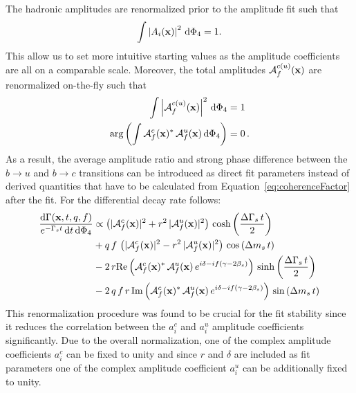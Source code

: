 The hadronic amplitudes are renormalized prior to the amplitude fit such that 
\begin{equation}
	\int  \left\vert   A_{i}(\mathbf{x}) \right\vert^{2} \, \mathrm{d}\Phi_4= 1 .
\end{equation}
This allow us to set more intuitive starting values as the amplitude coefficients are all on a comparable scale.
Moreover, the total amplitudes $\mathcal A^{c(u)}_{f}(\mathbf{x})$ are renormalized on-the-fly such that
\begin{align}
	\nonumber 
	\int  \left\vert  \mathcal A^{c(u)}_{f}(\mathbf{x}) \right\vert^{2} \, \mathrm{d}\Phi_4  & = 1  \\
	\text{arg}\left( \int \mathcal A^{c}_{f}(\mathbf{x})^* \, \mathcal A^{u}_{f}(\mathbf{x}) \, \mathrm{d}\Phi_4 \right) & = 0    \,.
\end{align}
As a result, the average amplitude ratio and strong phase difference between the $b\to u$ and $b\to c$ transitions can be introduced as direct fit parameters 
instead of derived quantities that have to be calculated from Equation~\ref{eq:coherenceFactor}
after the fit.
For the differential decay rate follows:
\begin{equation}
\begin{split}
\label{eq:PDF_full2}
	\frac{\text{d}\Gamma(\mathbf{x},t,q,f)}{ e^{- \Gamma_s t} \, \text{d}t \, \text{d}\Phi_4} &\propto  
	 \left( \vert \mathcal A^c_{f}(\mathbf{x}) \vert^2 + r^2 \, \vert \mathcal A^u_{f}(\mathbf{x}) \vert^2 \right) \, \text{cosh} \left( \frac{\Delta \Gamma_s \, t}{2}\right) \\
	 & + q \, f \,  \left( \vert \mathcal A^c_{f}(\mathbf{x}) \vert^2 - r^2 \, \vert \mathcal A^u_{f}(\mathbf{x})  \vert^2 \right) \, \text{cos} \left(\Delta m_s \, t \right)  \\
	 & -2 \, r \text{Re}\left( \mathcal A^c_{f}(\mathbf{x})^{*}  \, \mathcal A^u_{f}(\mathbf{x})  \, e^{i \delta - i f (\gamma - 2\beta_s)}  \right) \, \text{sinh} \left( \frac{\Delta \Gamma_s \, t}{2}\right)  \\
	 & -2 \, q \, f \, r \,  \text{Im}\left( \mathcal A^c_{f}(\mathbf{x})^{*} \, \mathcal A^u_{f}(\mathbf{x})  \, e^{i \delta -i f (\gamma - 2\beta_s)}  \right)\, \text{sin} \left(\Delta m_s \, t \right)  
\end{split}
\end{equation}
This renormalization procedure was found to be crucial for the fit stability since it reduces the correlation between the $a_i^c$ and $a_i^u$ amplitude coefficients significantly.
Due to the overall normalization, one of the complex amplitude coefficients $a_i^c$ can be fixed to unity 
and since $r$ and $\delta$ are included as fit parameters one of the complex amplitude coefficient $a_i^u$ can be additionally fixed to unity.

